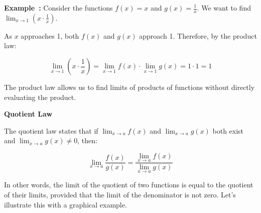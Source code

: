 \documentclass[a4paper,12pt]{book}
\newcounter{example}
\newenvironment{example}[1][\theexample]
  {\refstepcounter{example}\par\medskip\noindent\textbf{Example~#1:} \rmfamily}
  {\medskip}
\begin{document}
\begin{example}
Consider the functions \( f(x) = x \) and \( g(x) = \frac{1}{x} \). We want to find \( \lim_{{x \to 1}} (x \cdot \frac{1}{x}) \).

\begin{center}
\end{center}

As \( x \) approaches 1, both \( f(x) \) and \( g(x) \) approach 1. Therefore, by the product law:

\[
\lim_{{x \to 1}} (x \cdot \frac{1}{x}) = \lim_{{x \to 1}} f(x) \cdot \lim_{{x \to 1}} g(x) = 1 \cdot 1 = 1
\]
\end{example}

The product law allows us to find limits of products of functions without directly evaluating the product.

\textbf{Quotient Law}

The quotient law states that if \( \lim_{{x \to a}} f(x) \) and \( \lim_{{x \to a}} g(x) \) both exist and \( \lim_{{x \to a}} g(x) \neq 0 \), then:

\[
\lim_{{x \to a}} \frac{f(x)}{g(x)} = \frac{\lim_{{x \to a}} f(x)}{\lim_{{x \to a}} g(x)}
\]

In other words, the limit of the quotient of two functions is equal to the quotient of their limits, provided that the limit of the denominator is not zero. Let's illustrate this with a graphical example.
\end{document}
